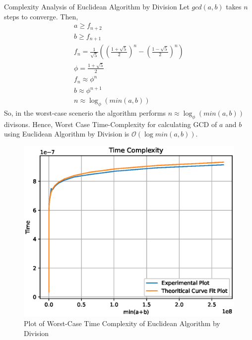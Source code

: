 \documentclass[8pt]{beamer}
\begin{document}
\begin{frame}[allowframebreaks]{Complexity Analysis of Euclidean Algorithm by Division}
Let $gcd(a,b)$ takes $n$ steps to converge. Then,
\begin{align}
a \geq f_{n+2}\\
b \geq f_{n+1}\\
f_{n}=\frac{1}{\sqrt{5}}\left(\left(\frac{1+\sqrt{5}}{2}\right)^{n}-\left(\frac{1-\sqrt{5}}{2}\right)^{n}\right)\\
\phi = \frac{1+\sqrt{5}}{2}\\
f_{n} \approx \phi^{n}\\
b \approx \phi^{n+1}\\
n \approx \log_{\phi}{\left(min(a,b)\right)}
\end{align}
So, in the worst-case scenerio the algorithm performs $n \approx \log_{\phi}{\left(min(a,b)\right)} $ divisons. Hence, Worst Case Time-Complexity for calculating GCD of $a$ and  $b$ using Euclidean Algorithm by Division is $\mathcal{O}(\log min(a,b))$.\\

\framebreak

\begin{figure}[!ht]
	\centering
	\includegraphics[scale=0.5]{figs/Euclid_Division.eps}
	\caption{Plot of Worst-Case Time Complexity of Euclidean Algorithm by Division}
	\label{fig:1}
\end{figure}

\end{frame}
\end{document}
